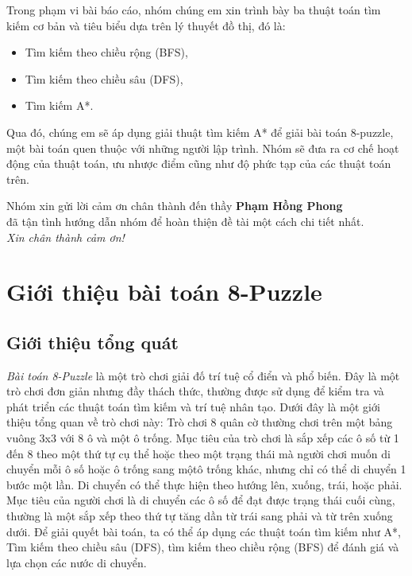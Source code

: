 \documentclass{article}
\begin{document}
Trong phạm vi bài báo cáo, nhóm chúng em xin trình bày ba thuật toán tìm kiếm cơ bản và tiêu biểu 
dựa trên lý thuyết đồ thị, đó là: 
\begin{itemize}
    \item Tìm kiếm theo chiều rộng (BFS),
    \item Tìm kiếm theo chiều sâu (DFS),
    \item Tìm kiếm A*.
\end{itemize}

Qua đó, chúng em sẽ áp dụng giải thuật tìm kiếm A* để giải bài toán 8-puzzle, 
một bài toán quen thuộc với những người lập trình. 
Nhóm sẽ đưa ra cơ chế hoạt động của thuật toán, 
ưu nhược điểm cũng như độ phức tạp của các thuật toán trên.

\vspace{0.5cm}
\begin{flushright}
Nhóm xin gửi lời cảm ơn chân thành đến thầy \textbf{Phạm Hồng Phong} \\
đã tận tình hướng dẫn nhóm để hoàn thiện đề tài một cách chi tiết nhất. \\[0.5cm]

\textit{Xin chân thành cảm ơn!}
\end{flushright}

\newpage
\section{Giới thiệu bài toán 8-Puzzle}
\subsection{Giới thiệu tổng quát}
\textit{Bài toán 8-Puzzle} là một trò chơi giải đố trí tuệ cổ điển và phổ biến. Đây là một trò chơi đơn giản nhưng đầy thách thức, thường được sử dụng để kiểm tra và phát triển các thuật toán tìm kiếm và trí tuệ nhân tạo. Dưới đây là một giới thiệu tổng quan về trò chơi này: Trò chơi 8 quân cờ thường chơi trên một bảng vuông 3x3 với 8 ô và một ô trống. Mục tiêu của trò chơi là sắp xếp các ô số từ 1 đến 8 theo một thứ tự cụ thể hoặc theo một trạng thái mà người chơi muốn di chuyển mỗi ô số hoặc ô trống sang mộtô trống khác, nhưng chỉ có thể di chuyển 1 bước một lần. Di chuyển có thể thực hiện theo hướng lên, xuống, trái, hoặc phải. Mục tiêu của người chơi là di chuyển các ô số để đạt được trạng thái cuối cùng, thường là một sắp xếp theo thứ tự tăng dần từ trái sang phải và từ trên xuống dưới. Để giải quyết bài toán, ta có thể áp dụng các thuật toán tìm kiếm như A*, Tìm kiếm theo chiều sâu (DFS), tìm kiếm theo chiều rộng (BFS) để đánh giá và lựa chọn các nước di chuyển.
\end{document}
